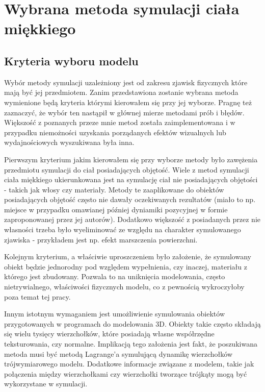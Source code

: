 \chapter{Wybrana metoda symulacji ciała miękkiego}

\section{Kryteria wyboru modelu}

Wybór metody symulacji uzależniony jest od zakresu zjawisk fizycznych które mają
być jej przedmiotem. Zanim przedstawiona zostanie wybrana metoda wymienione będą
kryteria którymi kierowałem się przy jej wyborze.  Pragnę też zaznaczyć, że
wybór ten nastąpił w głównej mierze metodami prób i błędów.  Większość z
poznanych przeze mnie metod została zaimplementowana i w przypadku niemożności
uzyskania porządanych efektów wizualnych lub wydajnościowych wyszukiwana była
inna.

Pierwszym kryterium jakim kierowałem się przy wyborze metody było zawężenia
przedmiotu symulacji do ciał posiadających objętość. Wiele z metod symulacji
ciała miękkiego ukierunkowana jest na symulację ciał nie posiadających objętości
- takich jak włosy czy materiały. Metody te zaaplikowane do obiektów
posiadających objętość często nie dawały oczekiwanych rezultatów (miało to
		np. miejsce w przypadku omawianej później dyniamiki pozycyjnej w formie
		zaproponowanej przez jej autorów). Dodatkowo większość z posiadanych przez nie
własności trzeba było wyeliminować ze względu na charakter symulowanego zjawiska
- przykładem jest np. efekt marszczenia powierzchni.

Kolejnym kryterium, a właściwie uproszczeniem było założenie, że symulowany
obiekt będzie jednorodny pod względem wypełnienia, czy inaczej, materiału z
którego jest zbudowany. Pozwala to na uniknięcia modelowania, często
nietrywialnego, właściwości fizycznych modelu, co z pewnością wykroczyłoby poza
temat tej pracy. 

Innym istotnym wymaganiem jest umożliwienie symulowania obiektów
przygotowanych w programach do modelowania 3D. Obiekty takie często składają się
wielu tysięcy wierzchołków, które posiadają własne współrzędne teksturowania,
czy normalne. Implikacją tego założenia jest fakt, że poszukiwana metoda musi być
metodą Lagrange'a symulującą dynamikę wierzchołków trójwymiarowego modelu.
Dodatkowe informacje związane z modelem, takie jak połączenia między
wierzchołkami czy wierzchołki tworzące trójkąty mogą być wykorzystane w
symulacji.

